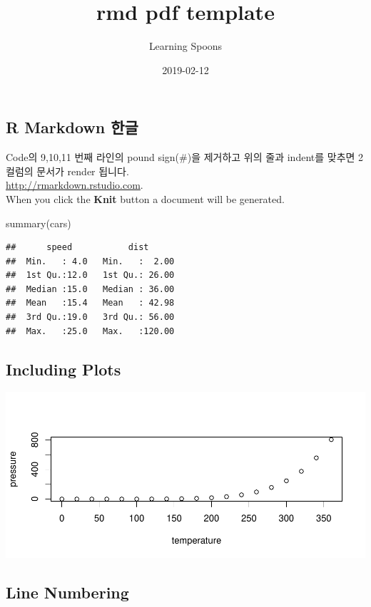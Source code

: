 \documentclass[twocolumn]{article}
\title{rmd pdf template}
\author{Learning Spoons}
\date{2019-02-12}
\newenvironment{Shaded}{}{}
\newcommand{\KeywordTok}[1]{\textcolor[rgb]{0.00,0.00,1.00}{#1}}
\newcommand{\NormalTok}[1]{#1}
\begin{document}
\maketitle

\subsection{R Markdown 한글}\label{r-markdown-}

Code의 9,10,11 번째 라인의 pound sign(\#)을 제거하고 위의 줄과 indent를
맞추면 2 컬럼의 문서가 render 됩니다.\\
\url{http://rmarkdown.rstudio.com}.\\
When you click the \textbf{Knit} button a document will be generated.

\begin{Shaded}
\begin{Highlighting}[]
\KeywordTok{summary}\NormalTok{(cars)  }
\end{Highlighting}
\end{Shaded}

\begin{verbatim}
##      speed           dist       
##  Min.   : 4.0   Min.   :  2.00  
##  1st Qu.:12.0   1st Qu.: 26.00  
##  Median :15.0   Median : 36.00  
##  Mean   :15.4   Mean   : 42.98  
##  3rd Qu.:19.0   3rd Qu.: 56.00  
##  Max.   :25.0   Max.   :120.00
\end{verbatim}

\subsection{Including Plots}\label{including-plots}

\includegraphics{rmd-pdf-template_files/figure-latex/pressure-1.pdf}

\subsection{Line Numbering}\label{line-numbering}
\end{document}
